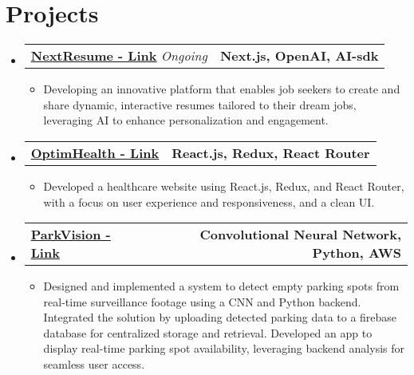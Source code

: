 \documentclass[letterpaper,11pt]{article}
\makeatletter
\newcommand{\resumeItem}[1]{
  \item\small{
    {#1 \vspace{-2pt}}
  }
}
\newcommand{\resumeProjectHeading}[2]{
    \item
    \begin{tabular*}{1.001\textwidth}{l@{\extracolsep{\fill}}r}
      \small#1 & \textbf{\small #2}\\
    \end{tabular*}\vspace{-7pt}
}
\newcommand{\resumeSubHeadingListStart}{\begin{itemize}[leftmargin=0.0in, label={}]}
\newcommand{\resumeSubHeadingListEnd}{\end{itemize}}
\newcommand{\resumeItemListStart}{\begin{itemize}}
\newcommand{\resumeItemListEnd}{\end{itemize}\vspace{-5pt}}
\makeatother
\begin{document}
\section{Projects}
\vspace{-6pt}
\resumeSubHeadingListStart
    \resumeProjectHeading
      {\href{https://nextresume.app/}{\underline{\textbf{NextResume - Link}}}  \emph{Ongoing}}{Next.js, OpenAI, AI-sdk}
      \resumeItemListStart
        \resumeItem{Developing an innovative platform that enables job seekers to create and share dynamic, interactive resumes tailored to their dream jobs, leveraging AI to enhance personalization and engagement.}
      \resumeItemListEnd
    \vspace{-16pt}
        \resumeProjectHeading
        {\href{https://github.com/sgandhi15/hc-static}{\underline{\textbf{OptimHealth - Link}}}  \emph{}}{React.js, Redux, React Router}
        \resumeItemListStart
          \resumeItem{Developed a healthcare website using React.js, Redux, and React Router, with a focus on user experience and responsiveness, and a clean UI.}
        \resumeItemListEnd
        \vspace{-16pt}
    \resumeProjectHeading
        {\href{https://github.com/sgandhi15/parkvision-archive}{\underline{\textbf{ParkVision - Link}}}  \emph{}}{Convolutional Neural Network, Python, AWS}
        \resumeItemListStart
            \resumeItem{Designed and implemented a system to detect empty parking spots from real-time surveillance footage using a CNN and Python backend. Integrated the solution by uploading detected parking data to a firebase database for centralized storage and retrieval. Developed an app to display real-time parking spot availability, leveraging backend analysis for seamless user access.}
        \resumeItemListEnd
  \resumeSubHeadingListEnd
\vspace{-15pt}
\end{document}
